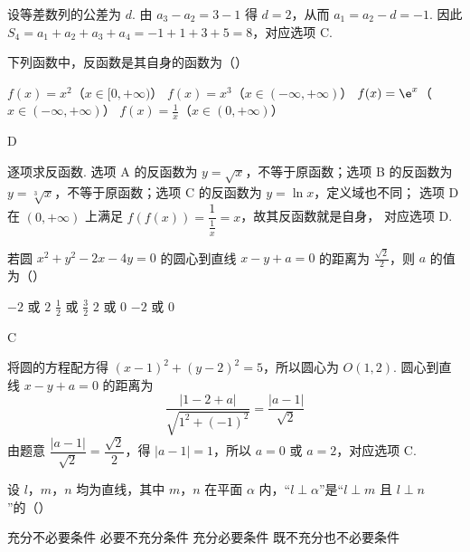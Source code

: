 \begin{solution}
设等差数列的公差为 \(d\). 由 \(a_{3}-a_{2}=3-1\) 得 \(d=2\)，从而
\(a_{1}=a_{2}-d=-1\). 因此
\(S_{4}=a_{1}+a_{2}+a_{3}+a_{4}=-1+1+3+5=8\)，对应选项 C.
\end{solution}

\begin{problem}
下列函数中，反函数是其自身的函数为（\quad）

\choices
    {\(f(x) = x^{2}\)（\(x \in [0, +\infty)\)）}
    {\(f(x) = x^{3}\)（\(x \in (-\infty, +\infty)\)）}
    {\(f(x) = \e^{x}\)（\(x \in (-\infty, +\infty)\)）}
    {\(f(x) = \frac{1}{x}\)（\(x \in (0, +\infty)\)）}
\end{problem}

\begin{answer}
D
\end{answer}

\begin{solution}
逐项求反函数. 选项 A 的反函数为 \(y=\sqrt{x}\)，不等于原函数；选项 B 的反函数为
\(y=\sqrt[3]{x}\)，不等于原函数；选项 C 的反函数为 \(y=\ln x\)，定义域也不同；
选项 D 在 \((0,+\infty)\) 上满足 \(f(f(x))=\dfrac{1}{\frac{1}{x}}=x\)，故其反函数就是自身，
对应选项 D.
\end{solution}

\begin{problem}
若圆 \(x^{2} + y^{2} - 2x - 4y = 0\) 的圆心到直线 \(x - y + a = 0\) 的距离为 \(\frac{\sqrt{2}}{2}\)，则 \(a\) 的值为（\quad）

\choices
    {\(-2\) 或 \(2\)}
    {\(\frac{1}{2}\) 或 \(\frac{3}{2}\)}
    {\(2\) 或 \(0\)}
    {\(-2\) 或 \(0\)}
\end{problem}

\begin{answer}
C
\end{answer}

\begin{solution}
将圆的方程配方得
\((x-1)^{2}+(y-2)^{2}=5\)，所以圆心为 \(O(1,2)\). 圆心到直线
\(x-y+a=0\) 的距离为
\[
\frac{|1-2+a|}{\sqrt{1^{2}+(-1)^{2}}}=\frac{|a-1|}{\sqrt2}
\]
由题意 \(\dfrac{|a-1|}{\sqrt2}=\dfrac{\sqrt2}{2}\)，得 \(|a-1|=1\)，所以
\(a=0\) 或 \(a=2\)，对应选项 C.
\end{solution}

\begin{problem}
设 \(l\)，\(m\)，\(n\) 均为直线，其中 \(m\)，\(n\) 在平面 \(\alpha\) 内，“\(l \perp \alpha\)”是“\(l \perp m\) 且 \(l \perp n\)”的（\quad）

\choices
    {充分不必要条件}
    {必要不充分条件}
    {充分必要条件}
    {既不充分也不必要条件}
\end{problem}

